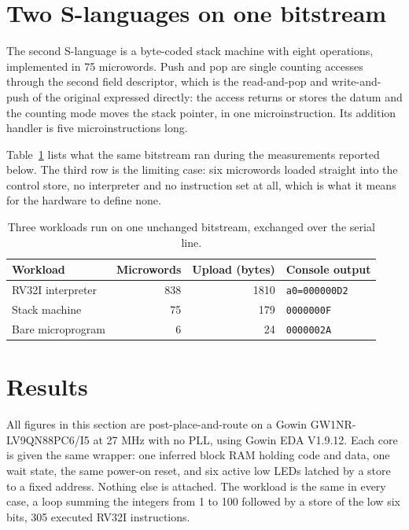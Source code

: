 \documentclass[11pt,a4paper]{article}
\begin{document}
\section{Two S-languages on one bitstream}
\label{sec:swap}

The second S-language is a byte-coded stack machine with eight
operations, implemented in 75 microwords. Push and pop are single
counting accesses through the second field descriptor, which is the
read-and-pop and write-and-push of the original expressed directly: the
access returns or stores the datum and the counting mode moves the
stack pointer, in one microinstruction. Its addition handler is five
microinstructions long.

Table~\ref{tab:slang} lists what the same bitstream ran during the
measurements reported below. The third row is the limiting case: six
microwords loaded straight into the control store, no interpreter and
no instruction set at all, which is what it means for the hardware to
define none.

\begin{table}[!htb]
\centering
\caption{Three workloads run on one unchanged bitstream, exchanged over
the serial line.}
\label{tab:slang}
\begin{tabular}{@{}lrrl@{}}
\toprule
Workload & Microwords & Upload (bytes) & Console output \\
\midrule
RV32I interpreter & 838 & 1810 & \texttt{a0=000000D2} \\
Stack machine & 75 & 179 & \texttt{0000000F} \\
Bare microprogram & 6 & 24 & \texttt{0000002A} \\
\bottomrule
\end{tabular}
\end{table}

\section{Results}
\label{sec:results}

All figures in this section are post-place-and-route on a Gowin
GW1NR-LV9QN88PC6/I5 at 27 MHz with no PLL, using Gowin EDA V1.9.12.
Each core is given the same wrapper: one inferred block RAM holding
code and data, one wait state, the same power-on reset, and six active
low LEDs latched by a store to a fixed address. Nothing else is
attached. The workload is the same in every case, a loop summing the
integers from 1 to 100 followed by a store of the low six bits, 305
executed RV32I instructions.
\end{document}

